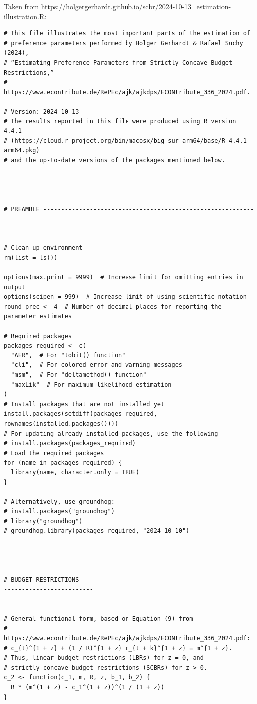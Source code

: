 
Taken from \url{https://holgergerhardt.github.io/scbr/2024-10-13_estimation-illustration.R}:

\begin{lstlisting}
# This file illustrates the most important parts of the estimation of
# preference parameters performed by Holger Gerhardt & Rafael Suchy (2024),
# “Estimating Preference Parameters from Strictly Concave Budget Restrictions,”
# https://www.econtribute.de/RePEc/ajk/ajkdps/ECONtribute_336_2024.pdf.

# Version: 2024-10-13
# The results reported in this file were produced using R version 4.4.1
# (https://cloud.r-project.org/bin/macosx/big-sur-arm64/base/R-4.4.1-arm64.pkg)
# and the up-to-date versions of the packages mentioned below.




# PREAMBLE ------------------------------------------------------------------------------------


# Clean up environment
rm(list = ls())

options(max.print = 9999)  # Increase limit for omitting entries in output
options(scipen = 999)  # Increase limit of using scientific notation
round_prec <- 4  # Number of decimal places for reporting the parameter estimates

# Required packages
packages_required <- c(
  "AER",  # For "tobit() function"
  "cli",  # For colored error and warning messages
  "msm",  # For "deltamethod() function"
  "maxLik"  # For maximum likelihood estimation
)
# Install packages that are not installed yet
install.packages(setdiff(packages_required, rownames(installed.packages())))
# For updating already installed packages, use the following
# install.packages(packages_required)
# Load the required packages
for (name in packages_required) {
  library(name, character.only = TRUE)
}

# Alternatively, use groundhog:
# install.packages("groundhog")
# library("groundhog")
# groundhog.library(packages_required, "2024-10-10")




# BUDGET RESTRICTIONS -------------------------------------------------------------------------


# General functional form, based on Equation (9) from
# https://www.econtribute.de/RePEc/ajk/ajkdps/ECONtribute_336_2024.pdf:
# c_{t}^{1 + z} + (1 / R)^{1 + z} c_{t + k}^{1 + z} = m^{1 + z}.
# Thus, linear budget restrictions (LBRs) for z = 0, and
# strictly concave budget restrictions (SCBRs) for z > 0.
c_2 <- function(c_1, m, R, z, b_1, b_2) {
  R * (m^(1 + z) - c_1^(1 + z))^(1 / (1 + z))
}


\end{lstlisting}
